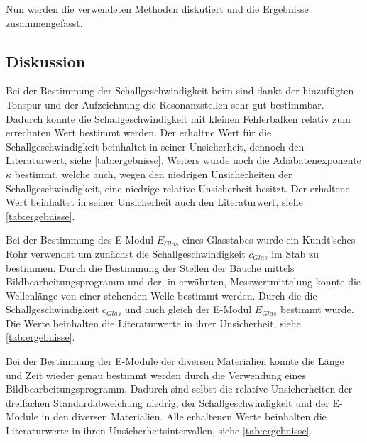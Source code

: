 \documentclass[11pt]{scrartcl}
\begin{document}
Nun werden die verwendeten Methoden diskutiert und die Ergebnisse 
zusammengefasst.

\subsection{Diskussion}
Bei der Bestimmung der Schallgeschwindigkeit beim
 sind dankt der hinzufügten Tonspur und der
Aufzeichnung die Resonanzstellen sehr gut bestimmbar. Dadurch konnte die
Schallgeschwindigkeit mit kleinen Fehlerbalken relativ zum errechnten Wert
bestimmt werden.  Der erhaltne Wert für die Schallgeschwindigkeit beinhaltet in
seiner Unsicherheit, dennoch den Literaturwert, siehe \autoref{tab:ergebnisse}.
Weiters wurde noch die Adiabatenexponente $\kappa$ bestimmt, welche auch, wegen
den niedrigen Unsicherheiten der Schallgeschwindigkeit, eine niedrige relative
Unsicherheit besitzt. Der erhaltene Wert beinhaltet in seiner Unsicherheit auch
den Literaturwert, siehe \autoref{tab:ergebnisse}.

Bei der Bestimmung des E-Modul $E_{Glas}$ eines Glasstabes wurde ein
Kundt'sches Rohr verwendet um zunächst die Schallgeschwindigkeit $c_{Glas}$ im
Stab zu bestimmen.  Durch die Bestimmung der Stellen der Bäuche mittels
Bildbearbeitungsprogramm und der, in  erwähnten,
Messwertmittelung konnte die Wellenlänge von einer stehenden Welle bestimmt
werden. Durch die die Schallgeschwindigkeit $c_{Glas}$ und auch gleich der
E-Modul $E_{Glas}$ bestimmt wurde. Die Werte beinhalten die Literaturwerte in
ihrer Unsicherheit, siehe \autoref{tab:ergebnisse}.

Bei der Bestimmung der E-Module der diversen Materialien konnte die Länge und
Zeit wieder genau bestimmt werden durch die Verwendung eines
Bildbearbeitungsprogramm. Dadurch sind selbst die relative Unsicherheiten der
dreifachen Standardabweichung niedrig, der Schallgeschwindigkeit und der
E-Module in den diversen Materialien. Alle erhaltenen Werte beinhalten die
Literaturwerte in ihren Unsicherheitsintervallen, siehe
\autoref{tab:ergebnisse}.
\end{document}
